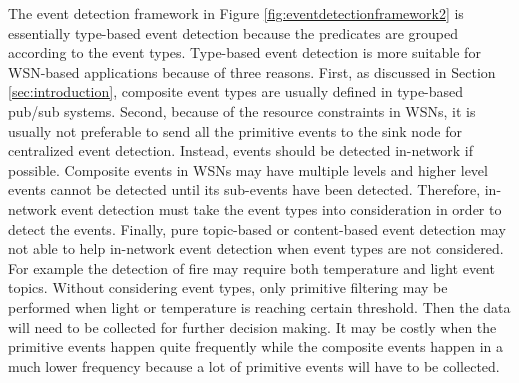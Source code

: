 The event detection framework in Figure \ref{fig:eventdetectionframework2} is essentially type-based event detection because the predicates are grouped according to the event types. Type-based event detection is more suitable for WSN-based applications because of three reasons. First, as discussed in Section \ref{sec:introduction}, composite event types are usually defined in type-based pub/sub systems. Second, because of the resource constraints in WSNs, it is usually not preferable to send all the primitive events to the sink node for centralized event detection. Instead, events should be detected in-network if possible. Composite events in WSNs may have multiple levels and higher level events cannot be detected until its sub-events have been detected. Therefore, in-network event detection must take the event types into consideration in order to detect the events.  Finally, pure topic-based or content-based event detection may not able to help in-network event detection when event types are not considered. For example the detection of fire may require both temperature and light event topics. Without considering event types, only primitive filtering may be performed when light or temperature is reaching certain threshold. Then the data will need to be collected for further decision making. It may be costly when the primitive events happen quite frequently while the composite events happen in a much lower frequency because a lot of primitive events will have to be collected.
